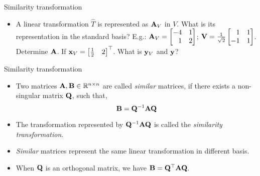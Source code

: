 \documentclass[aspectratio=169]{beamer}
\let\olditem\item
\renewcommand{\item}{\setlength{\itemsep}{\fill}\olditem}
\def\mf{\ensuremath\mathbf}
\def\mb{\ensuremath\mathbb}
\def\bmx{\ensuremath\begin{bmatrix*}[r]}
\def\emx{\ensuremath\end{bmatrix*}}
\begin{document}
\begin{frame}[t]{Similarity transformation}
\begin{itemize}
    \item A linear transformation $\hat{T}$ is represented as $\mf{A}_V$ in $V$. What is its representation in the standard basis? E.g.: $\mf{A}_V = \begin{bmatrix*}[r]-4 & 1\\1 & 2\end{bmatrix*}$; $\mf{V} = \frac{1}{\sqrt{2}}\begin{bmatrix*}[r]1 & 1\\-1 & 1\end{bmatrix*}$. Determine $\mf{A}$. If $\mf{x}_V = \bmx \frac{1}{2} & 2\emx^\top$. What is $\mf{y}_V$ and $\mf{y}$?
\end{itemize}
\end{frame}


\begin{frame}[t]{Similarity transformation}
\begin{itemize}
    \item Two matrices $\mf{A}, \mf{B} \in \mb{R}^{n \times n}$ are called \textit{similar} matrices, if there exists a non-singular matrix $\mf{Q}$, such that,
    \[ \mf{B} = \mf{Q}^{-1}\mf{A}\mf{Q} \]

    \item The transformation represented by $\mf{Q}^{-1}\mf{A}\mf{Q}$ is called the \textit{similarity transformation}.

    \item \textit{Similar} matrices represent the same linear transformation in different basis.

    \item When $\mf{Q}$ is an orthogonal matrix, we have $\mf{B} = \mf{Q}^\top\mf{A}\mf{Q}$. 
\end{itemize}
\end{frame}
\end{document}
